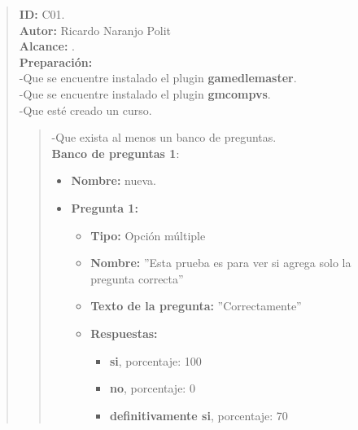 

\begin{quote} %
	\textbf{ID:} C01.\\
    \textbf{Autor: } Ricardo Naranjo Polit\\
	\textbf{Alcance:}  .\\
    \textbf{Preparación:}\\
      -Que se encuentre instalado el plugin {\bf gamedlemaster}.\\
      -Que se encuentre instalado el plugin {\bf gmcompvs}.\\
      -Que esté creado un curso.
      \begin{quote}
      -Que exista al menos un banco de preguntas.\\
      \textbf{Banco de preguntas 1}:
        	\begin{itemize} %
                \item \textbf{Nombre:} nueva.
                \item \textbf{Pregunta 1:}
                \begin{itemize}
                  \item \textbf{Tipo:} Opción múltiple
                  \item \textbf{Nombre:} ''Esta prueba es para ver si agrega solo la pregunta correcta''
                  \item \textbf{Texto de la pregunta:} ''Correctamente''
                  \item \textbf{Respuestas:}
                  \begin{itemize}
                    \item \textbf{si}, porcentaje: 100
                    \item \textbf{no}, porcentaje: 0
                    \item \textbf{definitivamente si}, porcentaje: 70
                  \end{itemize}
                \end{itemize}


\end{itemize}
\end{quote}
\end{quote}
